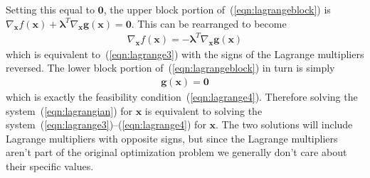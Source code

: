 \documentclass[11pt]{article}
\theoremstyle{definition} %
\begin{document}
Setting this equal to $\mathbf{0}$, the upper block portion of~(\ref{eqn:lagrangeblock}) is $\nabla_{\mathbf{x}} f(\mathbf{x}) + \boldsymbol{\lambda}^T \nabla_{\mathbf{x}} \mathbf{g}(\mathbf{x}) = \mathbf{0}$. This can be rearranged to become
\begin{align*}
	\nabla_{\mathbf{x}} f(\mathbf{x}) = -\boldsymbol{\lambda}^T \nabla_{\mathbf{x}} \mathbf{g}(\mathbf{x})
\end{align*}
which is equivalent to~(\ref{eqn:lagrange3}) with the signs of the Lagrange multipliers reversed. The lower block portion of~(\ref{eqn:lagrangeblock}) in turn is simply
\begin{align*}
	\mathbf{g}(\mathbf{x}) = \mathbf{0}
\end{align*}
which is exactly the feasibility condition~(\ref{eqn:lagrange4}). Therefore solving the system~(\ref{eqn:lagrangian}) for $\mathbf{x}$ is equivalent to solving the system~(\ref{eqn:lagrange3})--(\ref{eqn:lagrange4}) for $\mathbf{x}$. The two solutions will include Lagrange multipliers with opposite signs, but since the Lagrange multipliers aren't part of the original optimization problem we generally don't care about their specific values.
\end{document}
